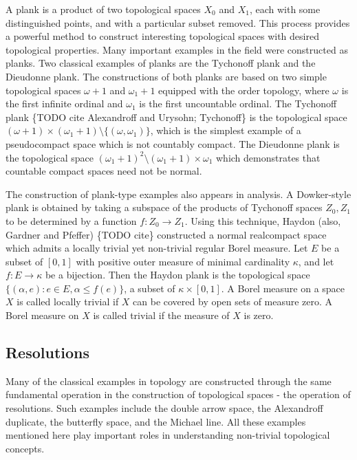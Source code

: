   A plank is a product of two topological spaces \(X_0\) and \(X_1\), each with
  some distinguished points, and with a particular subset removed. This process
  provides a powerful method to construct interesting topological spaces with
  desired topological properties. Many important examples in the field
  were constructed as planks. Two classical examples of planks are the
  Tychonoff plank and the Dieudonne plank.
  The constructions of both planks are based on two simple
  topological spaces \(\omega+1\) and \(\omega_1+1\) equipped with the order
  topology, where \(\omega\) is the first infinite ordinal and
  \(\omega_1\) is the first uncountable ordinal. The Tychonoff plank
  \cite[pp. 122-123]{MR0264581}
  \{TODO cite Alexandroff and Urysohn; Tychonoff\} is the topological space
  \((\omega+1 )\times (\omega_1+1)\setminus \{(\omega, \omega_1)\}\),
  which is the simplest example of a pseudocompact space which is not
  countably compact. The Dieudonne plank \cite{MR0013297} \cite[Ex38]{MR1382863}
  is the topological space
  \((\omega_1+1)^2\setminus (\omega_1+1)\times \omega_1\) which demonstrates
  that countable compact spaces need not be normal.

  The construction of plank-type examples also appears in analysis. A
  Dowker-style plank is obtained by taking a subspace of the products of
  Tychonoff spaces \(Z_0,Z_1\) to be determined by a function
  \(f:Z_0\to Z_1\). Using this technique, Haydon (also, Gardner and Pfeffer)
  \{TODO cite\}
  constructed a normal realcompact space which admits a locally trivial yet
  non-trivial regular Borel measure. Let \(E\) be a subset of \([0, 1]\) with
  positive outer measure of minimal cardinality \(\kappa\), and
  let \(f: E\rightarrow \kappa\) be a bijection. Then the Haydon plank is the
  topological space \(\{(\alpha, e): e\in E, \alpha\leq f(e)\}\), a
  subset of \(\kappa\times [0, 1]\). A Borel measure on a space \(X\) is called
  locally trivial if \(X\) can be covered by open sets of measure zero. A
  Borel measure on \(X\) is called trivial if the measure of \(X\) is zero.

  \subsection{Resolutions}

  Many of the classical examples in topology are constructed
  through the same fundamental operation in the construction of topological spaces -
  the operation of resolutions.  Such examples include the double arrow space,
  the Alexandroff duplicate, the butterfly space, and the Michael line. All these
  examples mentioned here play important roles in understanding non-trivial
  topological concepts.

